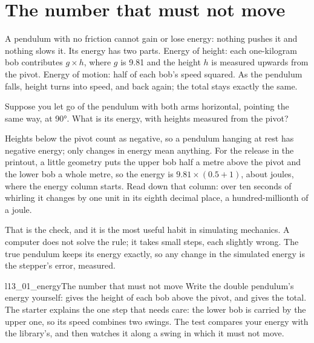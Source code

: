 \section{The number that must not move}
\label{sec:ch13-energy}

\noindent
A pendulum with no friction cannot gain or lose energy: nothing pushes it and
nothing slows it. Its energy has two parts. Energy of height: each one-kilogram
bob contributes $g \times h$, where $g$ is \num{9.81} and the height $h$ is
measured upwards from the pivot. Energy of motion: half of each bob's speed
squared. As the pendulum falls, height turns into speed, and back again; the
total stays exactly the same.

\begin{think}
Suppose you let go of the pendulum with both arms horizontal, pointing the
same way, at 90°. What is its energy, with heights measured from the pivot?
\end{think}
Heights below the pivot count as negative, so a pendulum hanging at rest has
negative energy; only changes in energy mean anything. For the release in the
printout, a little geometry puts the upper bob half a metre above the pivot
and the lower bob a whole metre, so the energy is $\num{9.81} \times
(\num{0.5} + 1)$, about  joules, where the energy
column starts. Read down that column: over ten seconds of whirling it changes
by one unit in its eighth decimal place, a hundred-millionth of a joule.

That is the check, and it is the most useful habit in simulating mechanics. A
computer does not solve the rule; it takes small steps, each slightly wrong.
The true pendulum keeps its energy exactly, so any change in the simulated
energy is the stepper's error, measured.

\begin{lab}{l13_01_energy}{The number that must not move}
Write the double pendulum's energy yourself:  gives the height
of each bob above the pivot, and  gives the total. The starter
explains the one step that needs care: the lower bob is carried by the upper
one, so its speed combines two swings. The test compares your energy with the
library's, and then watches it along a swing in which it must not move.
\end{lab}

